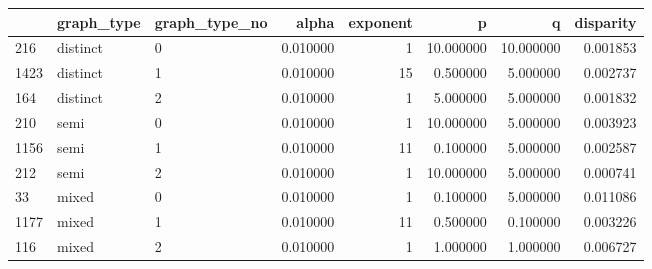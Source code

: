 \begin{tabular}{lllrrrrr}
\toprule
 & graph_type & graph_type_no & alpha & exponent & p & q & disparity \\
\midrule
216 & distinct & 0 & 0.010000 & 1 & 10.000000 & 10.000000 & 0.001853 \\
1423 & distinct & 1 & 0.010000 & 15 & 0.500000 & 5.000000 & 0.002737 \\
164 & distinct & 2 & 0.010000 & 1 & 5.000000 & 5.000000 & 0.001832 \\
210 & semi & 0 & 0.010000 & 1 & 10.000000 & 5.000000 & 0.003923 \\
1156 & semi & 1 & 0.010000 & 11 & 0.100000 & 5.000000 & 0.002587 \\
212 & semi & 2 & 0.010000 & 1 & 10.000000 & 5.000000 & 0.000741 \\
33 & mixed & 0 & 0.010000 & 1 & 0.100000 & 5.000000 & 0.011086 \\
1177 & mixed & 1 & 0.010000 & 11 & 0.500000 & 0.100000 & 0.003226 \\
116 & mixed & 2 & 0.010000 & 1 & 1.000000 & 1.000000 & 0.006727 \\
\bottomrule
\end{tabular}
